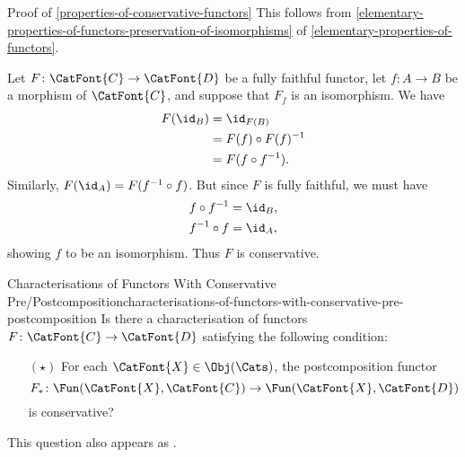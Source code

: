 \begin{Proof}{Proof of \cref{properties-of-conservative-functors}}%
    This follows from \cref{elementary-properties-of-functors-preservation-of-isomorphisms} of \cref{elementary-properties-of-functors}.

    Let $F\colon\CatFont{C}\to\CatFont{D}$ be a fully faithful functor, let $f\colon A\to B$ be a morphism of $\CatFont{C}$, and suppose that $F_{f}$ is an isomorphism. We have
    \begin{align*}
        F(\id_{B}) &= \id_{F(B)}\\
                   &= F(f)\circ F(f)^{-1}\\
                   &= F(f\circ f^{-1}).
    \end{align*}
    Similarly, $F(\id_{A})=F(f^{-1}\circ f)$. But since $F$ is fully faithful, we must have
    \begin{align*}
        f\circ f^{-1} &= \id_{B},\\
        f^{-1}\circ f &= \id_{A},
    \end{align*}
    showing $f$ to be an isomorphism. Thus $F$ is conservative.
\end{Proof}
\begin{question}{Characterisations of Functors With Conservative Pre/Postcomposition}{characterisations-of-functors-with-conservative-pre-postcomposition}%
    Is there a characterisation of functors $F\colon\CatFont{C}\to\CatFont{D}$ satisfying the following condition:
    \begin{itemize}
        \item[$(\star)$]For each $\CatFont{X}\in\Obj(\Cats)$, the postcomposition functor
            \[
                F_{*}%
                \colon%
                \Fun(\CatFont{X},\CatFont{C})%
                \to%
                \Fun(\CatFont{X},\CatFont{D})%
            \]%
            is conservative?
    \end{itemize}
    This question also appears as \cite{MO468125}.
\end{question}
